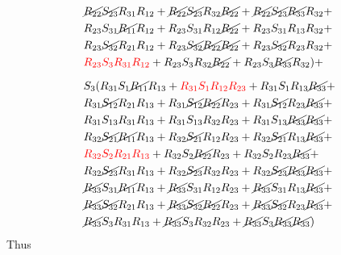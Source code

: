 \begin{equation}
\begin{split}
        &   \cancel{R_{22}}\cancel{S_{23}}R_{31}R_{12} + \cancel{R_{22}}\cancel{S_{23}}R_{32}\cancel{R_{22}} + \cancel{R_{22}}\cancel{S_{23}}\cancel{R_{33}}R_{32} +    \\
        &   R_{23}S_{31}\cancel{R_{11}}R_{12} + R_{23}S_{31}R_{12}\cancel{R_{22}} + R_{23}S_{31}R_{13}R_{32} +    \\
        &   R_{23}\cancel{S_{32}}R_{21}R_{12} + R_{23}\cancel{S_{32}}\cancel{R_{22}}\cancel{R_{22}} + R_{23}\cancel{S_{32}}R_{23}R_{32} +    \\
        &   {\color{red}R_{23}S_{3}R_{31}R_{12}} + R_{23}S_{3}R_{32}\cancel{R_{22}} + R_{23}S_{3}\cancel{R_{33}}R_{32} 
        ) + \\[6pt]
        &   S_{3}(
            R_{31}S_{1}\cancel{R_{11}}R_{13} + {\color{red}R_{31}S_{1}R_{12}R_{23}} + R_{31}S_{1}R_{13}\cancel{R_{33}} +    \\
        &   R_{31}\cancel{S_{12}}R_{21}R_{13} + R_{31}\cancel{S_{12}}\cancel{R_{22}}R_{23} + R_{31}\cancel{S_{12}}R_{23}\cancel{R_{33}} +    \\
        &   R_{31}S_{13}R_{31}R_{13} + R_{31}S_{13}R_{32}R_{23} + R_{31}S_{13}\cancel{R_{33}}\cancel{R_{33}} +    \\
        &   R_{32}\cancel{S_{21}}\cancel{R_{11}}R_{13} + R_{32}\cancel{S_{21}}R_{12}R_{23} + R_{32}\cancel{S_{21}}R_{13}\cancel{R_{33}} +    \\
        &   {\color{red}R_{32}S_{2}R_{21}R_{13}} + R_{32}S_{2}\cancel{R_{22}}R_{23} + R_{32}S_{2}R_{23}\cancel{R_{33}} +    \\
        &   R_{32}\cancel{S_{23}}R_{31}R_{13} + R_{32}\cancel{S_{23}}R_{32}R_{23} + R_{32}\cancel{S_{23}}\cancel{R_{33}}\cancel{R_{33}} +    \\
        &   \cancel{R_{33}}S_{31}\cancel{R_{11}}R_{13} + \cancel{R_{33}}S_{31}R_{12}R_{23} + \cancel{R_{33}}S_{31}R_{13}\cancel{R_{33}} +    \\
        &   \cancel{R_{33}}\cancel{S_{32}}R_{21}R_{13} + \cancel{R_{33}}\cancel{S_{32}}\cancel{R_{22}}R_{23} + \cancel{R_{33}}\cancel{S_{32}}R_{23}\cancel{R_{33}} +    \\
        &   \cancel{R_{33}}S_{3}R_{31}R_{13} + \cancel{R_{33}}S_{3}R_{32}R_{23} + \cancel{R_{33}}S_{3}\cancel{R_{33}}\cancel{R_{33}})
    \end{split}
\end{equation}
Thus
